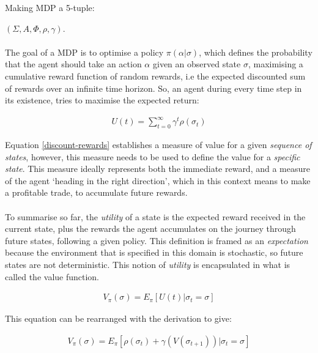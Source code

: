 \documentclass[ %
                    author={Ashwinder Khurana},
                supervisor={Prof Dave Cliff},
                    degree={MEng},
                     title={The Deeply Reinforced Trader},
                  subtitle={},
                      type={enterprise},
                      year={2020} ]{dissertation}
\begin{document}
Making MDP a 5-tuple:{$(\Sigma,A, \Phi, \rho,\gamma)$.
\\
\\
\noindent
The goal of a MDP is to optimise a policy $\pi(\alpha | \sigma)$, which defines the probability that the agent should take an action $\alpha$ given an observed state $\sigma$, maximising a cumulative reward function of random rewards, i.e the expected discounted sum of rewards over an infinite time horizon. So, an agent during every time step in its existence, tries to maximise the expected return:

\begin{equation}
\label{discount-rewards}
\begin{split}
U(t) = \sum\limits^{\infty}_{t=0}{\gamma^{t} \rho(\sigma_t)}
\end{split}
\end{equation}

\vspace{0.5cm}
\noindent
Equation \ref{discount-rewards} establishes a measure of value for a given \textit{sequence of states}, however, this measure needs to be used to define the value for a \textit{specific state}. This measure ideally represents both the immediate reward, and a measure of the agent \enquote*{heading in the right direction}, which in this context means to make a profitable trade, to accumulate future rewards.
\\
\\
To summarise so far, the \textit{utility} of a state is the expected reward received in the current state, plus the rewards the agent accumulates on the journey through future states, following a given policy. This definition is framed as an \textit{expectation} because the environment that is specified in this domain is stochastic, so future states are not deterministic. This notion of \textit{utility} is encapsulated in what is called the value function. 

\begin{equation}
\label{expected-discounted-rewards}
\begin{split}
V_\pi (\sigma) = E_\pi [U(t) | \sigma_t = \sigma]
\end{split}
\end{equation}

\noindent 
This equation can be rearranged with the derivation \cite{rearrange-value-function} to give:

\begin{equation}
\label{expected-discounted-rewards-rephrased}
\begin{split}
V_\pi (\sigma) = E_\pi [\rho(\sigma_t) + \gamma(V( \sigma_{t+1})) | \sigma_t = \sigma ]
\end{split}
\end{equation}

}
\end{document}
